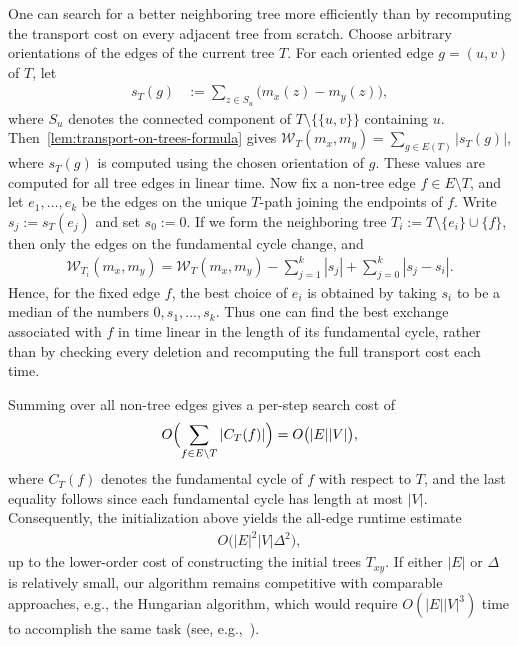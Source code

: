 \documentclass[11pt,a4paper]{article}
\newcommand{\wass}{{\mathcal{W}}}
\begin{document}
    One can search for a better neighboring tree more efficiently than by recomputing the transport cost on every adjacent tree from scratch.
    Choose arbitrary orientations of the edges of the current tree $T$. For each oriented edge $g=(u,v)$ of $T$, let
        \begin{align*}
            s_T(g) &:= \sum_{z\in S_u} \bigl(m_x(z)-m_y(z)\bigr),
        \end{align*}
    where $S_u$ denotes the connected component of $T\setminus\{\{u,v\}\}$ containing $u$. Then~\cref{lem:transport-on-trees-formula} gives $\wass_T(m_x,m_y)=\sum_{g\in E(T)} |s_T(g)|$, where $s_T(g)$ is computed using the chosen orientation of $g$. 
    These values are computed for all tree edges in linear time. Now fix a non-tree edge $f\in E\setminus T$, and let $e_1,\dots,e_k$ be the edges on the unique $T$-path joining the endpoints of $f$. Write $s_j:=s_T(e_j)$ and set $s_0:=0$. If we form the neighboring tree $T_i := T\setminus\{e_i\}\cup\{f\}$, then only the edges on the fundamental cycle change, and
        \begin{align*}
            \wass_{T_i}(m_x,m_y)
            = \wass_T(m_x,m_y) - \sum_{j=1}^k |s_j| + \sum_{j=0}^k |s_j-s_i|.
        \end{align*}
    Hence, for the fixed edge $f$, the best choice of $e_i$ is obtained by taking $s_i$ to be a median of the numbers $0,s_1,\dots,s_k$. Thus one can find the best exchange associated with $f$ in time linear in the length of its fundamental cycle, rather than by checking every deletion and recomputing the full transport cost each time.

    Summing over all non-tree edges gives a per-step search cost of
        \begin{align*}
            O\Bigl(\sum_{f\in E\setminus T} |C_T(f)|\Bigr) = O\bigl(|E||V|\bigr),
        \end{align*}
    where $C_T(f)$ denotes the fundamental cycle of $f$ with respect to $T$, and the last equality follows since each fundamental cycle has length at most $|V|$. Consequently, the initialization above yields the all-edge runtime estimate
        \begin{align*}
            O\bigl(|E|^2|V|\Delta^2\bigr),
        \end{align*}
    up to the lower-order cost of constructing the initial trees $T_{xy}$. If either $|E|$ or $\Delta$ is relatively small, our algorithm remains competitive with comparable approaches, e.g., the Hungarian algorithm, which would require $O(|E||V|^3)$ time to accomplish the same task (see, e.g.,~\cite{tomizawa1971techniques}).
\end{document}
